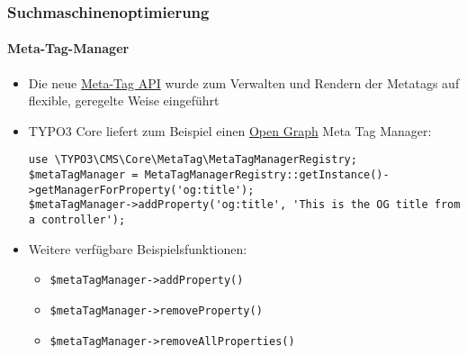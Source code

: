 \begin{frame}[fragile]
	\frametitle{Suchmaschinenoptimierung}
	\framesubtitle{Meta-Tag-Manager}

	\lstset{basicstyle=\tiny\ttfamily}

	\begin{itemize}
		\item Die neue
			\href{https://docs.typo3.org/typo3cms/CoreApiReference/ApiOverview/MetaTagApi/Index.html}{Meta-Tag API}
			wurde zum Verwalten und Rendern der Metatags auf flexible,
			geregelte Weise eingeführt
		\item TYPO3 Core liefert zum Beispiel einen \href{http://ogp.me/}{Open Graph}
			Meta Tag Manager:

\begin{lstlisting}
use \TYPO3\CMS\Core\MetaTag\MetaTagManagerRegistry;
$metaTagManager = MetaTagManagerRegistry::getInstance()->getManagerForProperty('og:title');
$metaTagManager->addProperty('og:title', 'This is the OG title from a controller');
\end{lstlisting}

		\item Weitere verfügbare Beispielsfunktionen:

			\begin{itemize}
				\smaller
					\item \texttt{\$metaTagManager->addProperty()}
					\item \texttt{\$metaTagManager->removeProperty()}
					\item \texttt{\$metaTagManager->removeAllProperties()}
			\end{itemize}

	\end{itemize}

\end{frame}


